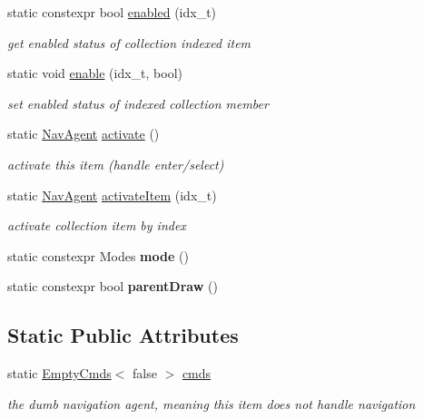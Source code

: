 \begin{DoxyCompactItemize}
static constexpr bool \hyperlink{structEmpty_adc2d105531fb7b43f60fcd9deaaaa71c}{enabled} (idx\+\_\+t)
\begin{DoxyCompactList}\small\item\em get enabled status of collection indexed item \end{DoxyCompactList}\item 
\mbox{\label{structEmpty_af4997efbad97edae86108c77b4b0f26a}} 
static void \hyperlink{structEmpty_af4997efbad97edae86108c77b4b0f26a}{enable} (idx\+\_\+t, bool)
\begin{DoxyCompactList}\small\item\em set enabled status of indexed collection member \end{DoxyCompactList}\item 
static \hyperlink{structNavAgent}{Nav\+Agent} \hyperlink{structEmpty_ade3cccf531dad6fe907c3a9764204e1c}{activate} ()
\begin{DoxyCompactList}\small\item\em activate this item (handle enter/select) \end{DoxyCompactList}\item 
\mbox{\label{structEmpty_a2f4d5ca0c3193ed070ef49c4dcc9eb5c}} 
static \hyperlink{structNavAgent}{Nav\+Agent} \hyperlink{structEmpty_a2f4d5ca0c3193ed070ef49c4dcc9eb5c}{activate\+Item} (idx\+\_\+t)
\begin{DoxyCompactList}\small\item\em activate collection item by index \end{DoxyCompactList}\item 
\mbox{\label{structEmpty_a8b3d397b1910943820e6bf56c3a6bf5d}} 
static constexpr Modes {\bfseries mode} ()
\item 
\mbox{\label{structEmpty_a5d08fca8ef6cedbd25eb086222e8216d}} 
static constexpr bool {\bfseries parent\+Draw} ()
\end{DoxyCompactItemize}
\subsection*{Static Public Attributes}
\begin{DoxyCompactItemize}
\item 
\mbox{\label{structEmpty_a17b77b2cc02c543127f2db455344f2d3}} 
static \hyperlink{structEmptyCmds}{Empty\+Cmds}$<$ false $>$ \hyperlink{structEmpty_a17b77b2cc02c543127f2db455344f2d3}{cmds}
\begin{DoxyCompactList}\small\item\em the dumb navigation agent, meaning this item does not handle navigation \end{DoxyCompactList}\end{DoxyCompactItemize}


